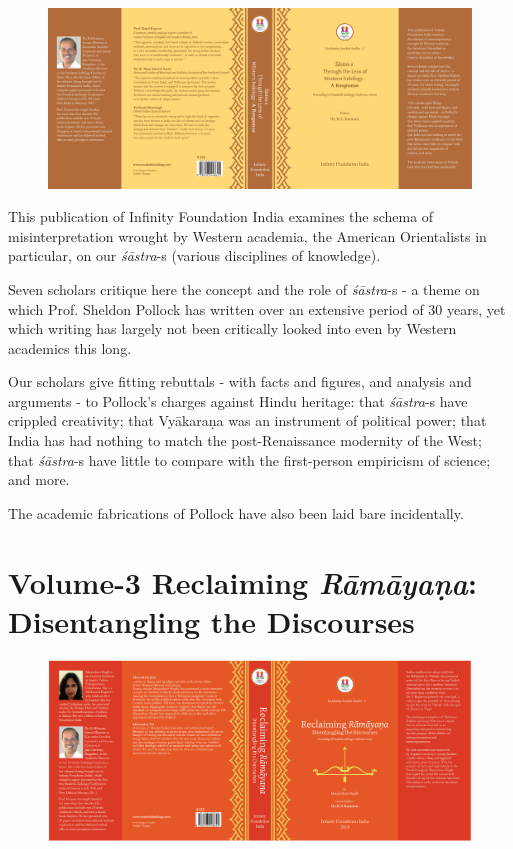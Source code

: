 \begin{figure}[!htbp]
\includegraphics[scale=.727]{images/fig02.png}
\end{figure}

This publication of Infinity Foundation India examines the schema of misinterpretation wrought by Western academia, the American Orientalists in particular, on our \textit{śāstra}-s (various disciplines of knowledge).

Seven scholars critique here the concept and the role of \textit{śāstra}-s - a theme on which Prof. Sheldon Pollock has written over an extensive period of 30 years, yet which writing has largely not been critically looked into even by Western academics this long.

Our scholars give fitting rebuttals - with facts and figures, and analysis and arguments - to Pollock's charges against Hindu heritage: that \textit{śāstra}-s have crippled creativity; that Vyākaraṇa was an instrument of political power; that India has had nothing to match the post-Renaissance modernity of the West; that \textit{śāstra}-s have little to compare with the first-person empiricism of science; and more.

The academic fabrications of Pollock have also been laid bare incidentally.

\newpage

\section*{Volume-3 Reclaiming \textit{Rāmāyaṇa}: Disentan\-gling the Discourses}

\begin{figure}[!htbp]
\includegraphics[scale=.81]{images/fig03.png}
\end{figure}

